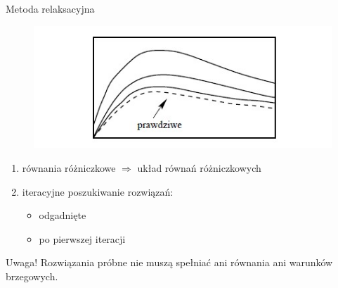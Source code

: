 \begin{frame}{Metoda relaksacyjna}
	\begin{figure}
		\includegraphics[height=0.35\textheight]{img/22/relaksacyjna.jpg}
	\end{figure}
    \begin{enumerate}
      \item równania różniczkowe $\Rightarrow$ układ równań różniczkowych
      \item iteracyjne poszukiwanie rozwiązań:
          \begin{itemize}
            \item odgadnięte
            \item po pierwszej iteracji
          \end{itemize}
    \end{enumerate}
    \begin{block}{Uwaga!}
    	Rozwiązania próbne nie muszą spełniać ani równania ani warunków brzegowych. 
    \end{block}
\end{frame}
